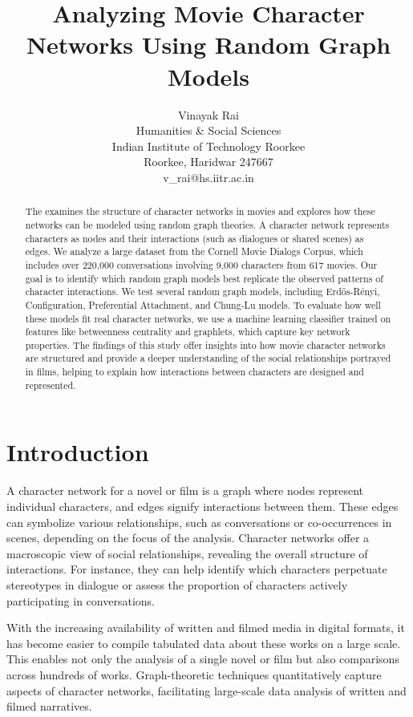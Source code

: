 \documentclass{article} %
\title{Analyzing Movie Character Networks Using Random Graph Models}
\author{
Vinayak Rai \\
Humanities \& Social Sciences \\
Indian Institute of Technology Roorkee\\
Roorkee, Haridwar 247667 \\
v\_rai@hs.iitr.ac.in\\
}
\begin{document}
\maketitle

\begin{abstract}
The examines the structure of character networks in movies and explores how these networks can be modeled using random graph theories. A character network represents characters as nodes and their interactions (such as dialogues or shared scenes) as edges. We analyze a large dataset from the Cornell Movie Dialogs Corpus, which includes over 220,000 conversations involving 9,000 characters from 617 movies. Our goal is to identify which random graph models best replicate the observed patterns of character interactions. We test several random graph models, including Erdős-Rényi, Configuration, Preferential Attachment, and Chung-Lu models. To evaluate how well these models fit real character networks, we use a machine learning classifier trained on features like betweenness centrality and graphlets, which capture key network properties. The findings of this study offer insights into how movie character networks are structured and provide a deeper understanding of the social relationships portrayed in films, helping to explain how interactions between characters are designed and represented.
\end{abstract}



\section{Introduction}
\label{headings}

A character network for a novel or film is a graph where nodes represent individual characters, and edges signify interactions between them. These edges can symbolize various relationships, such as conversations or co-occurrences in scenes, depending on the focus of the analysis. Character networks offer a macroscopic view of social relationships, revealing the overall structure of interactions. For instance, they can help identify which characters perpetuate stereotypes in dialogue or assess the proportion of characters actively participating in conversations.

With the increasing availability of written and filmed media in digital formats, it has become easier to compile tabulated data about these works on a large scale. This enables not only the analysis of a single novel or film but also comparisons across hundreds of works. Graph-theoretic techniques quantitatively capture aspects of character networks, facilitating large-scale data analysis of written and filmed narratives.
\end{document}
